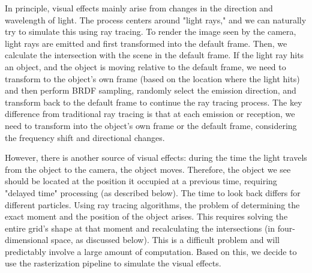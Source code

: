 \documentclass{article}
\begin{document}
In principle, visual effects mainly arise from changes in the direction and wavelength of light. The process centers around "light rays," and we can naturally try to simulate this using ray tracing. To render the image seen by the camera, light rays are emitted and first transformed into the default frame. Then, we calculate the intersection with the scene in the default frame. If the light ray hits an object, and the object is moving relative to the default frame, we need to transform to the object's own frame (based on the location where the light hits) and then perform BRDF sampling, randomly select the emission direction, and transform back to the default frame to continue the ray tracing process. The key difference from traditional ray tracing is that at each emission or reception, we need to transform into the object's own frame or the default frame, considering the frequency shift and directional changes. 

However, there is another source of visual effects: during the time the light travels from the object to the camera, the object moves. Therefore, the object we see should be located at the position it occupied at a previous time, requiring "delayed time" processing (as described below). The time to look back differs for different particles. Using ray tracing algorithms, the problem of determining the exact moment and the position of the object arises. This requires solving the entire grid's shape at that moment and recalculating the intersections (in four-dimensional space, as discussed below). This is a difficult problem and will predictably involve a large amount of computation. Based on this, we decide to use the rasterization pipeline to simulate the visual effects.
\end{document}
